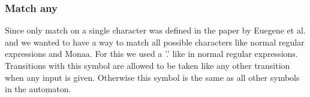 

\subsubsection{Match any}
Since only match on a single character was defined in the paper by Euegene et al. and we wanted to have a way to match all possible characters like normal regular expressions and Monaa. For this we used a '.' like in normal regular expressions. Transitions with this symbol are allowed to be taken like any other transition when any input is given. Otherwise this symbol is the same as all other symbols in the automaton.


